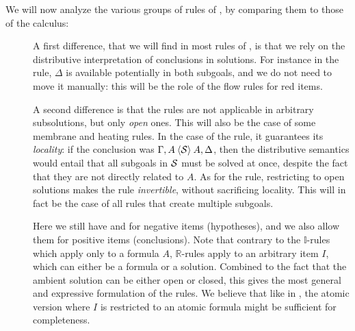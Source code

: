 We will now analyze the various groups of rules of , by
comparing them to those of the  calculus:
\begin{description}
  \item[\textbf{\identity}] 
  A first difference, that we will find in most rules of , is that
  we rely on the distributive interpretation of conclusions in solutions. For
  instance in the  rule, $\Delta$ is available potentially in
  both subgoals, and we do not need to move it manually: this will be the role
  of the flow rules for red items.
  
  A second difference is that the rules are not applicable in arbitrary
  subsolutions, but only \emph{open} ones. This will also be the case of some
  membrane and heating rules. In the case of the  rule, it
  guarantees its \emph{locality}: if the conclusion was $\Gamma, A \mathbin{\langle \mathcal{S} \rangle} A,
  \Delta$, then the distributive semantics would entail that all subgoals in
  $\mathcal{S}$ must be solved at once, despite the fact that they are not directly
  related to $A$. As for the
   rule, restricting to open solutions makes the rule
  \emph{invertible}, without sacrificing locality. This will in fact be the case
  of all rules that create multiple subgoals.

  \item[\textbf{\resource}] 
  Here we still have  and  for negative items (hypotheses),
  and we also allow them for positive items (conclusions). Note that contrary to
  the $\mathbb{I}$-rules which apply only to a formula $A$, $\mathbb{R}$-rules
  apply to an arbitrary item $I$, which can either be a formula or a solution.
  Combined to the fact that the ambient solution can be either open or closed,
  this gives the most general and expressive formulation of the rules. We
  believe that like in , the atomic version where $I$ is restricted to an
  atomic formula might be sufficient for completeness.

  \item[\textbf{\flow}]


\end{description}
